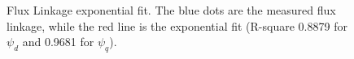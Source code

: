 \documentclass[9pt,conference]{IEEEtran}
\begin{document}
\begin{figure}[!htb]
	\begin{subfigmatrix}{2}
	\end{subfigmatrix}
	\caption{Flux Linkage exponential fit. The blue dots are the measured flux linkage, while the red line is the exponential fit (R-square 0.8879 for $\psi_d$ and 0.9681 for $\psi_q$).}
	\label{fig:flux_linkage_fit}%
\end{figure}
\end{document}

